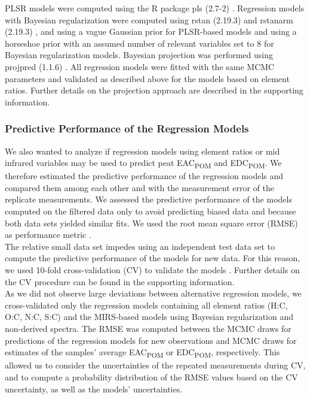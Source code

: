 \documentclass[alpha-refs, lineno]{wiley-article-rmd}
\begin{document}
PLSR models were computed using the R package pls (2.7-2) \autocite{Mevik.2019}. Regression models with Bayesian regularization were computed using rstan (2.19.3) \autocite{StanDevelopmentTeam.2020} and rstanarm (2.19.3) \autocite{Goodrich.2020}, and using a vague Gaussian prior for PLSR-based models and using a horseshoe prior with an assumed number of relevant variables set to 8 \autocite{Piironen.2017c} for Bayesian regularization models. Bayesian projection was performed using projpred (1.1.6) \autocite{Piironen.2019}. All regression models were fitted with the same MCMC parameters and validated as described above for the models based on element ratios. Further details on the projection approach are described in the supporting information.

\hypertarget{predictive-performance-of-the-regression-models}{%
\subsubsection{Predictive Performance of the Regression Models}\label{predictive-performance-of-the-regression-models}}

We also wanted to analyze if regression models using element ratios or mid infrared variables may be used to predict peat EAC\textsubscript{POM} and EDC\textsubscript{POM}. We therefore estimated the predictive performance of the regression models and compared them among each other and with the measurement error of the replicate measurements. We assessed the predictive performance of the models computed on the filtered data only to avoid predicting biased data and because both data sets yielded similar fits. We used the root mean square error (RMSE) as performance metric \autocite{Bellocchi.2010}.\\
The relative small data set impedes using an independent test data set to compute the predictive performance of the models for new data. For this reason, we used 10-fold cross-validation (CV) to validate the models \autocite{Roberts.2017}. Further details on the CV procedure can be found in the supporting information.\\
As we did not observe large deviations between alternative regression models, we cross-validated only the regression models containing all element ratios (H:C, O:C, N:C, S:C) and the MIRS-based models using Bayesian regularization and non-derived spectra.
The RMSE was computed between the MCMC draws for predictions of the regression models for new observations and MCMC draws for estimates of the samples' average EAC\textsubscript{POM} or EDC\textsubscript{POM}, respectively. This allowed us to consider the uncertainties of the repeated measurements during CV, and to compute a probability distribution of the RMSE values based on the CV uncertainty, as well as the models' uncertainties.
\end{document}
